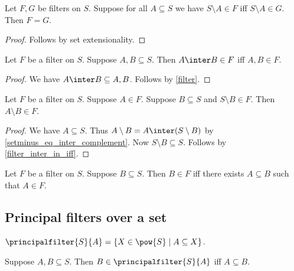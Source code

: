 \begin{proposition}\label{filter_ext_complement}
    Let $F, G$ be filters on $S$.
    Suppose for all $A\subseteq S$ we have $S\setminus A\in F$ iff $S\setminus A\in G$.
    Then $F = G$.
\end{proposition}
\begin{proof}
    Follows by set extensionality.
\end{proof}

\begin{proposition}\label{filter_inter_in_iff}
    Let $F$ be a filter on $S$.
    Suppose $A, B\subseteq S$.
    Then $A\inter B\in F$ iff $A, B\in F$.
\end{proposition}
\begin{proof}
    We have $A\inter B\subseteq A, B$.
    Follows by \cref{filter}.
\end{proof}

\begin{proposition}\label{filter_setminus_in}
    Let $F$ be a filter on $S$.
    Suppose $A\in F$.
    Suppose $B\subseteq S$ and $S\setminus B\in F$.
    Then $A\setminus B\in F$.
\end{proposition}
\begin{proof}
    We have $A\subseteq S$.
    Thus $A\setminus B = A\inter (S\setminus B)$ by \cref{setminus_eq_inter_complement}.
    Now $S\setminus B\subseteq S$.
    Follows by \cref{filter_inter_in_iff}.
\end{proof}

\begin{proposition}\label{filter_in_iff_exists_subset}
    Let $F$ be a filter on $S$.
    Suppose $B\subseteq S$.
    Then $B\in F$ iff there exists $A\subseteq B$ such that $A\in F$.
\end{proposition}


\subsection{Principal filters over a set}

\begin{definition}\label{principalfilter}
    $\principalfilter{S}{A} = \{X\in\pow{S}\mid A\subseteq X\}$.
\end{definition}

\begin{proposition}\label{principalfilter_iff}
    Suppose $A, B\subseteq S$.
    Then $B\in\principalfilter{S}{A}$ iff $A\subseteq B$.
\end{proposition}

